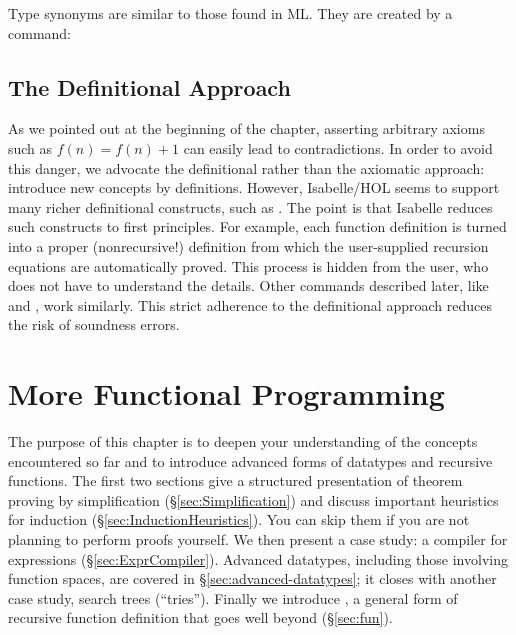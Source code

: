 %
Type synonyms are similar to those found in ML\@. They are created by a 
 command:

\medskip





\section{The Definitional Approach}
\label{sec:definitional}

%
As we pointed out at the beginning of the chapter, asserting arbitrary
axioms such as $f(n) = f(n) + 1$ can easily lead to contradictions. In order
to avoid this danger, we advocate the definitional rather than
the axiomatic approach: introduce new concepts by definitions. However,  Isabelle/HOL seems to
support many richer definitional constructs, such as
. The point is that Isabelle reduces such constructs to first principles. For example, each
 function definition is turned into a proper
(nonrecursive!) definition from which the user-supplied recursion equations are
automatically proved.  This process is
hidden from the user, who does not have to understand the details.  Other commands described
later, like  and , work similarly.  
This strict adherence to the definitional approach reduces the risk of 
soundness errors.

\chapter{More Functional Programming}

The purpose of this chapter is to deepen your understanding of the
concepts encountered so far and to introduce advanced forms of datatypes and
recursive functions. The first two sections give a structured presentation of
theorem proving by simplification ({\S}\ref{sec:Simplification}) and discuss
important heuristics for induction ({\S}\ref{sec:InductionHeuristics}).  You can
skip them if you are not planning to perform proofs yourself.
We then present a case
study: a compiler for expressions ({\S}\ref{sec:ExprCompiler}). Advanced
datatypes, including those involving function spaces, are covered in
{\S}\ref{sec:advanced-datatypes}; it closes with another case study, search
trees (``tries'').  Finally we introduce , a general
form of recursive function definition that goes well beyond 
 ({\S}\ref{sec:fun}).


